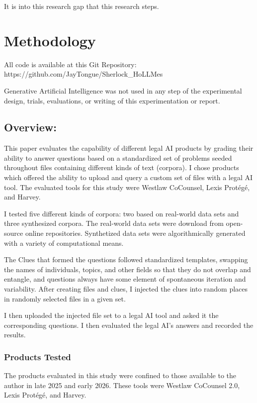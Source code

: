 \documentclass[
]{article}
\begin{document}
It is into this research gap that this research steps.

\section{Methodology}\label{methodology}

All code is available at this Git Repository:
https://github.com/JayTongue/Sherlock\_HoLLMes

Generative Artificial Intelligence was not used in any step of the
experimental design, trials, evaluations, or writing of this
experimentation or report.

\subsection{Overview:}\label{overview}

This paper evaluates the capability of different legal AI products by
grading their ability to answer questions based on a standardized set of
problems seeded throughout files containing different kinds of text
(corpora). I chose products which offered the ability to upload and
query a custom set of files with a legal AI tool. The evaluated tools
for this study were Westlaw CoCounsel, Lexis Protégé, and Harvey.

I tested five different kinds of corpora: two based on real-world data
sets and three synthesized corpora. The real-world data sets were
download from open-source online repositories. Synthetized data sets
were algorithmically generated with a variety of computational means.

The Clues that formed the questions followed standardized templates,
swapping the names of individuals, topics, and other fields so that they
do not overlap and entangle, and questions always have some element of
spontaneous iteration and variability. After creating files and clues, I
injected the clues into random places in randomly selected files in a
given set.

I then uploaded the injected file set to a legal AI tool and asked it
the corresponding questions. I then evaluated the legal AI's answers and
recorded the results.

\subsubsection{Products Tested}\label{products-tested}

The products evaluated in this study were confined to those available to
the author in late 2025 and early 2026. These tools were Westlaw
CoCounsel 2.0, Lexis Protégé, and Harvey.
\end{document}
